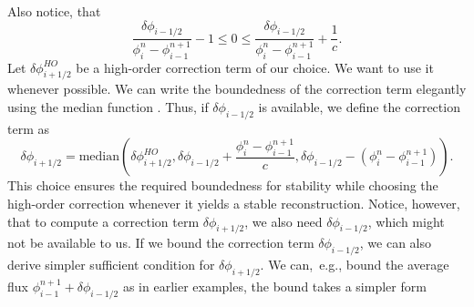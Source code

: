 \documentclass[../thesis.tex]{subfiles}
\begin{document}
Also notice, that
\begin{equation}
    \frac{\delta \phi_{i-1/2}}
    {\phi_{i}^{n} - \phi_{i-1}^{n+1}}
    -1
    \leq
    0
    \leq
    \frac{\delta \phi_{i-1/2}}
    {\phi_{i}^{n} - \phi_{i-1}^{n+1}}
    +\frac{1}{c}.
\end{equation}
Let \(\delta \phi_{i+1/2}^{HO}\) be a high-order correction term of our choice. We want to use it whenever possible.
We can write the boundedness of the correction term elegantly using the median function \cite{1989_Huynh_CONF}.
Thus, if \(\delta \phi_{i-1/2}\) is available, we define the correction term as
\begin{equation}
    \delta \phi_{i+1/2} = \mbox{median}\left(
        \delta \phi_{i+1/2}^{HO},
        \delta \phi_{i-1/2} + \frac{\phi_{i}^{n} - \phi_{i-1}^{n+1}}{c},
        \delta \phi_{i-1/2} - (\phi_{i}^{n} - \phi_{i-1}^{n+1})
    \right).
\end{equation}
This choice ensures the required boundedness for stability while choosing the high-order correction whenever it yields a stable reconstruction.
Notice, however, that to compute a correction term \(\delta \phi_{i+1/2}\), we also need \(\delta \phi_{i-1/2}\), which might not be available to us.
If we bound the correction term \(\delta \phi_{i-1/2}\), we can also derive simpler sufficient condition for \(\delta \phi_{i+1/2}\). We can,~e.g., bound the average flux \(\phi_{i-1}^{n+1} + \delta \phi_{i-1/2}\) as in earlier examples, the bound takes a simpler form
\end{document}
